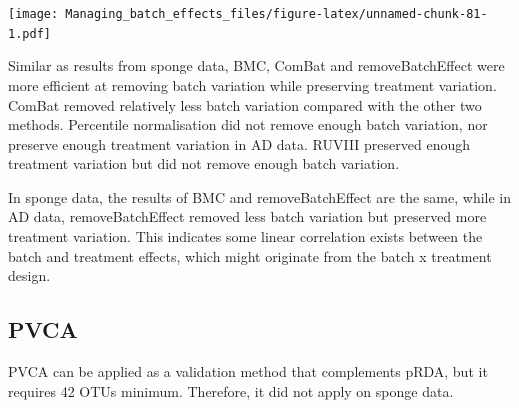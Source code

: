 \documentclass[]{book}
\begin{document}
\texttt{[image: Managing\_batch\_effects\_files/figure-latex/unnamed-chunk-81-1.pdf]}

Similar as results from sponge data, BMC, ComBat and removeBatchEffect
were more efficient at removing batch variation while preserving
treatment variation. ComBat removed relatively less batch variation
compared with the other two methods. Percentile normalisation did not
remove enough batch variation, nor preserve enough treatment variation
in AD data. RUVIII preserved enough treatment variation but did not
remove enough batch variation.

In sponge data, the results of BMC and removeBatchEffect are the same,
while in AD data, removeBatchEffect removed less batch variation but
preserved more treatment variation. This indicates some linear
correlation exists between the batch and treatment effects, which might
originate from the batch x treatment design.

\subsection{PVCA}\label{pvca}

PVCA can be applied as a validation method that complements pRDA, but it
requires 42 OTUs minimum. Therefore, it did not apply on sponge data.
\end{document}
